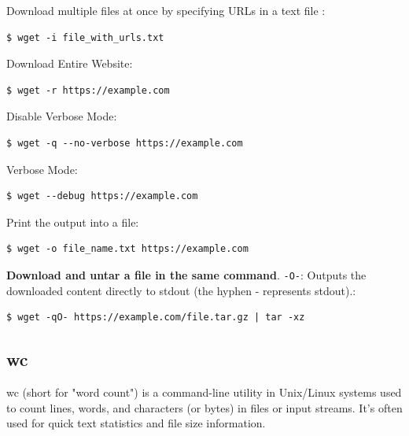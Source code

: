 \documentclass{article}
\newenvironment{codetemplate}[1][]{%
  \mybasecolorbox[#1]
  \itshape
}{%
  \endmybasecolorbox
}
\begin{document}
Download multiple files at once by specifying URLs in a text file :
\begin{codetemplate}{}
\begin{verbatim}
$ wget -i file_with_urls.txt
\end{verbatim}
\end{codetemplate}

Download Entire Website:
\begin{codetemplate}{}
\begin{verbatim}
$ wget -r https://example.com
\end{verbatim}
\end{codetemplate}

Disable Verbose Mode:
\begin{codetemplate}{}
\begin{verbatim}
$ wget -q --no-verbose https://example.com
\end{verbatim}
\end{codetemplate}

Verbose Mode:
\begin{codetemplate}{}
\begin{verbatim}
$ wget --debug https://example.com
\end{verbatim}
\end{codetemplate}

Print the output into a file:
\begin{codetemplate}{}
\begin{verbatim}
$ wget -o file_name.txt https://example.com
\end{verbatim}
\end{codetemplate}

\textbf{Download and untar a file in the same command}. \verb|-O-|: Outputs the downloaded content directly to stdout (the hyphen - represents stdout).:
\begin{codetemplate}{}
\begin{verbatim}
$ wget -qO- https://example.com/file.tar.gz | tar -xz
\end{verbatim}
\end{codetemplate}

\subsection{wc}
wc (short for "word count") is a command-line utility in Unix/Linux systems used to count lines, words, and characters (or bytes) in files or input streams. It's often used for quick text statistics and file size information.
\end{document}
